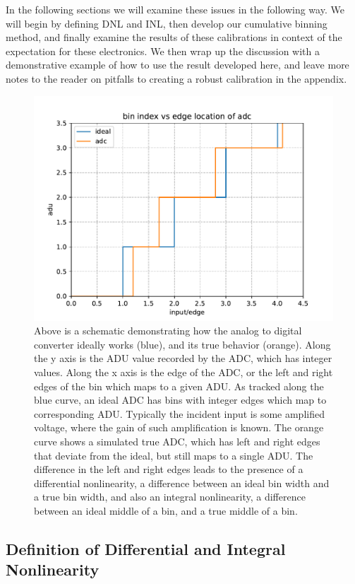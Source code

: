 \documentclass[11pt, letterpaper]{article}
\begin{document}
\indent 
In the following sections we will examine these issues in the following way.
We will begin by defining DNL and INL, then develop our cumulative binning method, and finally examine the results of these calibrations in context of the expectation for these electronics. 
We then wrap up the discussion with a demonstrative example of how to use the result developed here, and leave more notes to the reader on pitfalls to creating a robust calibration in the appendix. 

\begin{figure}
    \centering
    \includegraphics[width=0.5\linewidth]{dnlinlex.pdf}
    \caption{Above is a schematic demonstrating how the analog to digital converter ideally works (blue), and its true behavior (orange). Along the y axis is the ADU value recorded by the ADC, which has integer values. Along the x axis is the edge of the ADC, or the left and right edges of the bin which maps to a given ADU. As tracked along the blue curve, an ideal ADC has bins with integer edges which map to corresponding ADU. Typically the incident input is some amplified voltage, where the gain of such amplification is known. The orange curve shows a simulated true ADC, which has left and right edges that deviate from the ideal, but still maps to a single ADU. The difference in the left and right edges leads to the presence of a differential nonlinearity, a difference between an ideal bin width and a true bin width, and also an integral nonlinearity, a difference between an ideal middle of a bin, and a true middle of a bin.}
\end{figure}

\subsection{Definition of Differential and Integral Nonlinearity}
\indent 
\end{document}
